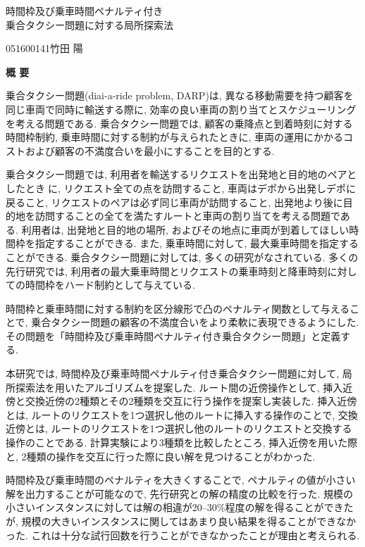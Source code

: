 \begin{center}
{\LARGE 時間枠及び乗車時間ペナルティ付き\\乗合タクシー問題に対する局所探索法}\\[0.5cm]
\end{center}
\hfill
{\large 051600141\qquad 竹田 陽}\\[0.5cm]
\begin{center}
{\Large \bf 概 要}\\
\end{center}


乗合タクシー問題(diai-a-ride problem, DARP)は, 異なる移動需要を持つ顧客を同じ車両で同時に輸送する際に, 効率の良い車両の割り当てとスケジューリングを考える問題である. 乗合タクシー問題では, 顧客の乗降点と到着時刻に対する時間枠制約, 乗車時間に対する制約が与えられたときに, 車両の運用にかかるコストおよび顧客の不満度合いを最小にすることを目的とする.

乗合タクシー問題では, 利用者を輸送するリクエストを出発地と目的地のペアとしたときに, リクエスト全ての点を訪問すること, 車両はデポから出発しデポに戻ること, リクエストのペアは必ず同じ車両が訪問すること, 出発地より後に目的地を訪問することの全てを満たすルートと車両の割り当てを考える問題である. 利用者は, 出発地と目的地の場所, およびその地点に車両が到着してほしい時間枠を指定することができる.
また, 乗車時間に対して, 最大乗車時間を指定することができる.
乗合タクシー問題に対しては, 多くの研究がなされている. 多くの先行研究では, 利用者の最大乗車時間とリクエストの乗車時刻と降車時刻に対しての時間枠をハード制約として与えている.

時間枠と乗車時間に対する制約を区分線形で凸のペナルティ関数として与えることで, 乗合タクシー問題の顧客の不満度合いをより柔軟に表現できるようにした. その問題を「時間枠及び乗車時間ペナルティ付き乗合タクシー問題」と定義する.

本研究では, 時間枠及び乗車時間ペナルティ付き乗合タクシー問題に対して, 局所探索法を用いたアルゴリズムを提案した.
ルート間の近傍操作として, 挿入近傍と交換近傍の2種類とその2種類を交互に行う操作を提案し実装した.
挿入近傍とは, ルートのリクエストを1つ選択し他のルートに挿入する操作のことで, 交換近傍とは, ルートのリクエストを1つ選択し他のルートのリクエストと交換する操作のことである.
計算実験により3種類を比較したところ, 挿入近傍を用いた際と, 2種類の操作を交互に行った際に良い解を見つけることがわかった.

時間枠及び乗車時間のペナルティを大きくすることで, ペナルティの値が小さい解を出力することが可能なので, 先行研究との解の精度の比較を行った. 規模の小さいインスタンスに対しては解の相違が20--30\%程度の解を得ることができたが, 規模の大きいインスタンスに関してはあまり良い結果を得ることができなかった. これは十分な試行回数を行うことができなかったことが理由と考えられる.

